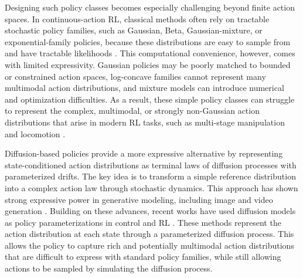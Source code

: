 \documentclass{article}
\newcommand{\1}{\mathbbm{1}}
\numberwithin{equation}{section}
\begin{document}
Designing such policy classes becomes especially challenging beyond finite action spaces. In continuous-action RL, classical methods often rely on
tractable stochastic policy families, such as Gaussian, Beta,
Gaussian-mixture, or exponential-family policies, because these distributions
are easy to sample from and have tractable likelihoods
\cite{haarnoja2018soft,hansen2023idql,schulman2015trust,schulman2017proximal}. This computational convenience, however, comes with limited expressivity.
Gaussian policies may be poorly matched to bounded or constrained action spaces, log-concave families cannot represent many multimodal action distributions, and mixture models can introduce numerical and optimization difficulties. As a result, these simple policy classes can struggle to represent the complex, multimodal, or strongly non-Gaussian action distributions that arise in modern
RL tasks, such as multi-stage manipulation
\cite{chi2025diffusion,ke20243d,scheikl2024movement} and locomotion
\cite{huang2024diffuseloco}.

Diffusion-based policies provide a more expressive alternative by representing state-conditioned action distributions as terminal laws of diffusion processes with parameterized drifts. The key idea is to transform a simple reference distribution into a complex action law through stochastic dynamics.  This approach has shown
strong expressive power in generative modeling, including image and video generation \cite{ho2020denoising,sohl2015deep,song2019generative}. Building on these advances, recent works have used diffusion models as policy parameterizations
in control and RL
\cite{balim2025model,chi2025diffusion,ding2024diffusion,ke20243d,ma2025efficient,psenka2024learning,
ren2025diffusion,scheikl2024movement,wang2024diffusion}. These methods represent the action distribution at each state through a parameterized diffusion process. This allows the policy to
capture rich and potentially multimodal action distributions that are difficult to express with standard policy families, while still allowing actions to be sampled by simulating the diffusion process.
\end{document}
